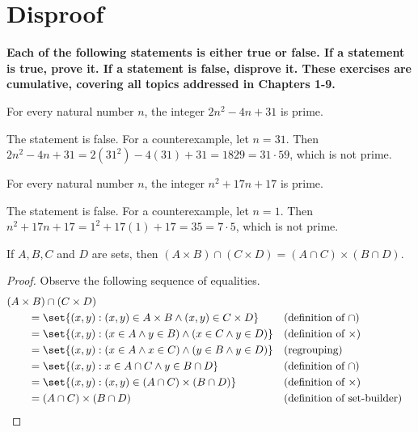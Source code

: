 \documentclass[DIN, pagenumber=false, fontsize=11pt, parskip=half]{scrartcl}
\title{}
\author{} %
\date{}
\begin{document}
\maketitle

\setcounter{section}{8}

\section{Disproof}

\textbf{Each of the following statements is either true or false.
    If a statement is true, prove it. If a statement is false, disprove it.
These exercises are cumulative, covering all topics addressed in Chapters 1-9.}

\begin{problems}
    \problem For every natural number $n$, the integer $2n^2-4n+31$ is prime.
    \begin{disproof}
        The statement is false. 
        For a counterexample, let $n = 31$.
        Then $2n^2-4n+31 = 2(31^2)-4(31)+31 = 1829 = 31 \cdot 59$,
        which is not prime.
    \end{disproof}

    \problem For every natural number $n$, the integer $n^2 + 17n+17$ is prime.
    \begin{disproof}
        The statement is false.
        For a counterexample, let $n = 1$.
        Then $n^2+17n+17 = 1^2 + 17(1) + 17 = 35 = 7 \cdot 5$,
        which is not prime.
    \end{disproof}

    \problem If $A,B,C$ and $D$ are sets, then $(A \times B) \cap (C \times D) = (A \cap C) \times (B \cap D)$.
    \begin{proof}
        Observe the following sequence of equalities.
        \begin{align*}
            \MoveEqLeft (A \times B) \cap (C \times D)\\
            & = \set{(x,y) : (x,y) \in A \times B \land (x,y) \in C \times D} && \text{(definition of $\cap$)}\\
            & = \set{(x,y) : (x \in A \land y \in B) \land (x \in C \land y \in D)} && \text{(definition of $\times$)}\\
            & = \set{(x,y) : (x \in A \land x \in C) \land (y \in B \land y \in D)} && \text{(regrouping)}\\
            & = \set{(x,y) : x \in A \cap C \land y \in B \cap D} && \text{(definition of $\cap$)}\\
            & = \set{(x,y) : (x,y) \in (A \cap C) \times (B \cap D)} && \text{(definition of $\times$)}\\
            & = (A \cap C) \times (B \cap D) && \text{(definition of set-builder)}
        \end{align*}
    \end{proof}


\end{problems}
\end{document}
